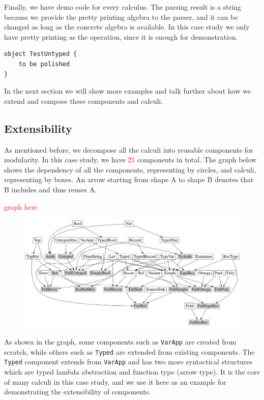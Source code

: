 Finally, we have demo code for every calculus. The parsing result is a string because we provide the pretty printing algebra to the parser, and it can be changed as long as the concrete algebra is available. In this case study we only have pretty printing as the operation, since it is enough for demonstration.

\begin{lstlisting}
object TestUntyped {
    to be polished
}
\end{lstlisting}

In the next section we will show more examples and talk further about how we extend and compose these components and calculi.

\subsection{Extensibility}\label{subsec:cs-extensibility}

As mentioned before, we decompose all the calculi into reusable components for modularity. In this case study, we have \textcolor{red}{21} components in total. The graph below shows the dependency of all the components, representing by circles, and calculi, representing by boxes. An arrow starting from shape A to shape B denotes that B includes and thus reuses A.

\textcolor{red}{graph here}

\begin{figure}
    \centering
    \includegraphics[width=\textwidth]{depGraph}
\end{figure}

As shown in the graph, some components such as \lstinline{VarApp} are created from scratch, while others such as \lstinline{Typed} are extended from existing components. The \lstinline{Typed} component extends from \lstinline{VarApp} and has two more syntactical structures which are typed lambda abstraction and function type (arrow type). It is the core of many calculi in this case study, and we use it here as an example for demonstrating the extensibility of components.

